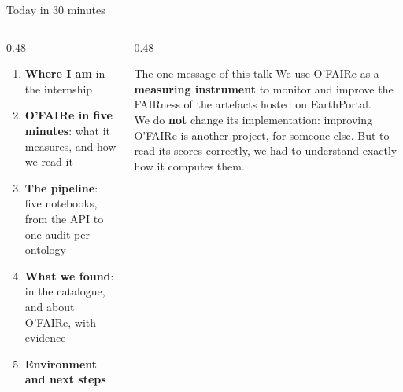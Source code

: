\documentclass[aspectratio=169,10pt]{beamer}
\begin{document}
\begin{frame}{Today in 30 minutes}
  \begin{columns}[T]
    \begin{column}{0.48\textwidth}
      \begin{enumerate}
        \item \textbf{Where I am} in the internship
        \item \textbf{O'FAIRe in five minutes}: what it measures, and how we read it
        \item \textbf{The pipeline}: five notebooks, from the API to one audit per ontology
        \item \textbf{What we found}: in the catalogue, and about O'FAIRe, with evidence
        \item \textbf{Environment and next steps}
      \end{enumerate}
    \end{column}
    \begin{column}{0.48\textwidth}
      \begin{exampleblock}{The one message of this talk}
        We use O'FAIRe as a \textbf{measuring instrument} to monitor and improve the FAIRness of the
        artefacts hosted on EarthPortal.\\[4pt]
        We do \textbf{not} change its implementation: improving O'FAIRe is another project, for
        someone else. But to read its scores correctly, we had to understand exactly how it
        computes them.
      \end{exampleblock}
    \end{column}
  \end{columns}
\end{frame}
\end{document}
